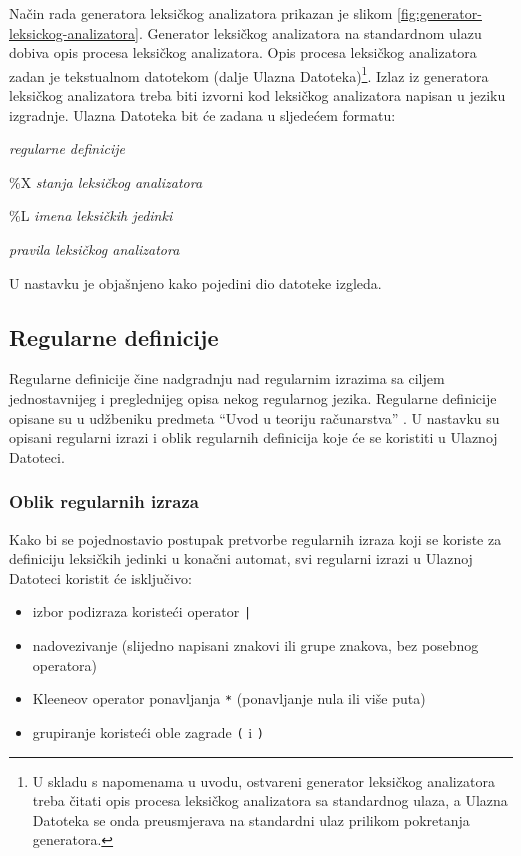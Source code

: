 \documentclass[times, 12pt, utf8]{book}
\begin{document}
Način rada generatora leksičkog analizatora prikazan je slikom \ref{fig:generator-leksickog-analizatora}.
Generator leksičkog analizatora na standardnom ulazu dobiva opis procesa leksičkog analizatora.
Opis procesa leksičkog analizatora zadan je tekstualnom datotekom (dalje Ulazna Datoteka)\footnote{U skladu s napomenama u uvodu, ostvareni generator leksičkog analizatora treba čitati opis procesa leksičkog analizatora sa standardnog ulaza, a Ulazna Datoteka se onda preusmjerava na standardni ulaz prilikom pokretanja generatora.}.
Izlaz iz generatora leksičkog analizatora treba biti izvorni kod leksičkog analizatora napisan u jeziku izgradnje.
Ulazna Datoteka bit će zadana u sljedećem formatu:
\begin{description}
\itemsep 1pt
\item \emph{regularne definicije}
\item \%X \emph{stanja leksičkog analizatora}
\item \%L \emph{imena leksičkih jedinki}
\item \emph{pravila leksičkog analizatora}
\end{description}
U nastavku je objašnjeno kako pojedini dio datoteke izgleda.

\subsection{Regularne definicije}
Regularne definicije čine nadgradnju nad regularnim izrazima sa ciljem jednostavnijeg i preglednijeg opisa nekog regularnog jezika.
Regularne definicije opisane su u udžbeniku predmeta “Uvod u teoriju računarstva” \cite[poglavlje 2.3.2]{utr}.
U nastavku su opisani regularni izrazi i oblik regularnih definicija koje će se koristiti u Ulaznoj Datoteci.

\subsubsection*{Oblik regularnih izraza}
Kako bi se pojednostavio postupak pretvorbe regularnih izraza koji se koriste za definiciju leksičkih jedinki u konačni automat, svi regularni izrazi u Ulaznoj Datoteci koristit će isključivo:
\begin{itemize}
\itemsep 1pt
\item izbor podizraza koristeći operator \verb=|=
\item nadovezivanje (slijedno napisani znakovi ili grupe znakova, bez posebnog operatora)
\item Kleeneov operator ponavljanja \verb=*= (ponavljanje nula ili više puta)
\item grupiranje koristeći oble zagrade \verb=(= i \verb=)=
\end{itemize}
\end{document}
